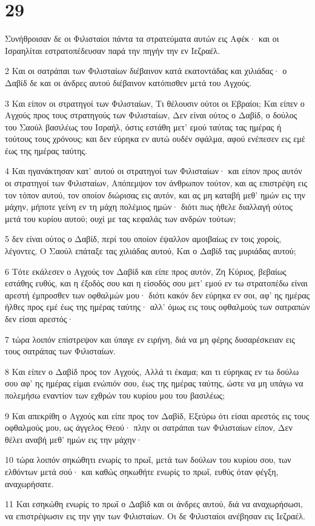 \chapter{29}

\par Συνήθροισαν δε οι Φιλισταίοι πάντα τα στρατεύματα αυτών εις Αφέκ· και οι Ισραηλίται εστρατοπέδευσαν παρά την πηγήν την εν Ιεζραέλ.
\par 2 Και οι σατράπαι των Φιλισταίων διέβαινον κατά εκατοντάδας και χιλιάδας· ο Δαβίδ δε και οι άνδρες αυτού διέβαινον κατόπισθεν μετά του Αγχούς.
\par 3 Και είπον οι στρατηγοί των Φιλισταίων, Τι θέλουσιν ούτοι οι Εβραίοι; Και είπεν ο Αγχούς προς τους στρατηγούς των Φιλισταίων, Δεν είναι ούτος ο Δαβίδ, ο δούλος του Σαούλ βασιλέως του Ισραήλ, όστις εστάθη μετ' εμού ταύτας τας ημέρας ή τούτους τους χρόνους; και δεν εύρηκα εν αυτώ ουδέν σφάλμα, αφού ενέπεσεν εις εμέ έως της ημέρας ταύτης.
\par 4 Και ηγανάκτησαν κατ' αυτού οι στρατηγοί των Φιλισταίων· και είπον προς αυτόν οι στρατηγοί των Φιλισταίων, Απόπεμψον τον άνθρωπον τούτον, και ας επιστρέψη εις τον τόπον αυτού, τον οποίον διώρισας εις αυτόν, και ας μη καταβή μεθ' ημών εις την μάχην, μήποτε γείνη εν τη μάχη πολέμιος ημών· διότι πως ήθελε διαλλαγή ούτος μετά του κυρίου αυτού; ουχί με τας κεφαλάς των ανδρών τούτων;
\par 5 δεν είναι ούτος ο Δαβίδ, περί του οποίον έψαλλον αμοιβαίως εν τοις χοροίς, λέγοντες, Ο Σαούλ επάταξε τας χιλιάδας αυτού, Και ο Δαβίδ τας μυριάδας αυτού;
\par 6 Τότε εκάλεσεν ο Αγχούς τον Δαβίδ και είπε προς αυτόν, Ζη Κύριος, βεβαίως εστάθης ευθύς, και η έξοδός σου και η είσοδός σου μετ' εμού εν τω στρατοπέδω είναι αρεστή έμπροσθεν των οφθαλμών μου· διότι κακόν δεν εύρηκα εν σοι, αφ' ης ημέρας ήλθες προς εμέ έως της ημέρας ταύτης· αλλ' όμως εις τους οφθαλμούς των σατραπών δεν είσαι αρεστός·
\par 7 τώρα λοιπόν επίστρεψον και ύπαγε εν ειρήνη, διά να μη φέρης δυσαρέσκειαν εις τους σατράπας των Φιλισταίων.
\par 8 Και είπεν ο Δαβίδ προς τον Αγχούς, Αλλά τι έκαμα; και τι εύρηκας εν τω δούλω σου αφ' ης ημέρας είμαι ενώπιόν σου, έως της ημέρας ταύτης, ώστε να μη υπάγω να πολεμήσω εναντίον των εχθρών του κυρίου μου του βασιλέως;
\par 9 Και απεκρίθη ο Αγχούς και είπε προς τον Δαβίδ, Εξεύρω ότι είσαι αρεστός εις τους οφθαλμούς μου, ως άγγελος Θεού· πλην οι σατράπαι των Φιλισταίων είπον, Δεν θέλει αναβή μεθ' ημών εις την μάχην·
\par 10 τώρα λοιπόν σηκώθητι ενωρίς το πρωΐ, μετά των δούλων του κυρίου σου, των ελθόντων μετά σού· και καθώς σηκωθήτε ενωρίς το πρωΐ, ευθύς όταν φέγξη, αναχωρήσατε.
\par 11 Και εσηκώθη ενωρίς το πρωΐ ο Δαβίδ και οι άνδρες αυτού, διά να αναχωρήσωσι, να επιστρέψωσιν εις την γην των Φιλισταίων. Οι δε Φιλισταίοι ανέβησαν εις Ιεζραέλ.

